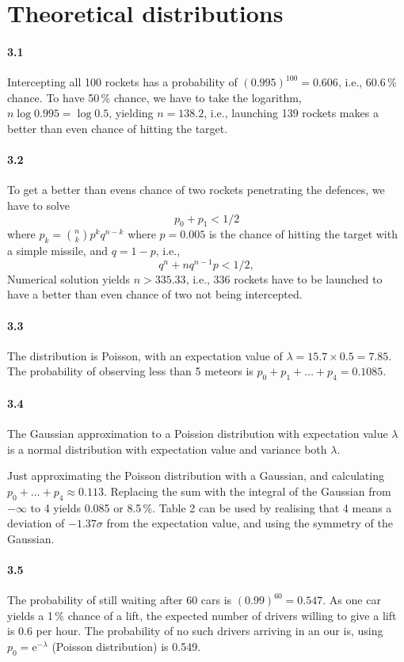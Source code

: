 \documentclass[a4paper,12pt]{article}
\def\e{\mathrm{e}}
\begin{document}
\section{Theoretical distributions}\label{sec:TheoreticalDistributions}

\paragraph{3.1} Intercepting all 100 rockets has a probability of $(0.995)^{100} = 0.606$, i.e., 60.6\,\% chance. To have 50\,\% chance, we have to take the logarithm, $n \log 0.995 = \log 0.5$, yielding $n=138.2$, i.e., launching 139 rockets makes a better than even chance of hitting the target.

\paragraph{3.2} To get a better than evens chance of two rockets penetrating the defences, we have to solve
\[
 p_0 + p_1 < 1/2
\]
where $p_k = \binom{n}{k} p^k q^{n-k}$ where $p=0.005$ is the chance of hitting the target with a simple missile, and $q=1-p$, i.e.,
\[
 q^n + n q^{n-1}p < 1/2,
\]
Numerical solution yields $n>335.33$, i.e., 336 rockets have to be launched to have a better than even chance of two not being intercepted.

\paragraph{3.3} The distribution is Poisson, with an expectation value of $\lambda=15.7 \times 0.5 = 7.85$. The probability of observing less than 5 meteors is $p_0 + p_1 + \dots + p_4 = 0.1085$.

\paragraph{3.4} The Gaussian approximation to a Poission distribution with expectation value $\lambda$ is a normal distribution with expectation value and variance both $\lambda$.

Just approximating the Poisson distribution with a Gaussian, and calculating $p_0 +\dots + p_4 \approx 0.113$. Replacing the sum with the integral of the Gaussian from $-\infty$ to 4 yields 0.085 or 8.5\,\%. Table 2 can be used by realising that 4 means a deviation of $-1.37\sigma$ from the expectation value, and using the symmetry of the Gaussian.

\paragraph{3.5} The probability of still waiting after 60 cars is $(0.99)^{60} = 0.547$. As one car yields a 1\,\% chance of a lift, the expected number of drivers willing to give a lift is 0.6 per hour. The probability of no such drivers arriving in an our is, using $p_0 = \e^{-\lambda}$ (Poisson distribution) is 0.549.
\end{document}

